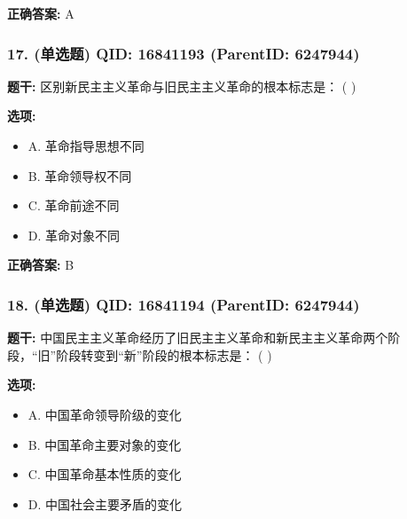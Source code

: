 \documentclass[12pt,UTF8]{ctexart}
\begin{document}
\textbf{正确答案:}
A

\vspace{0.3em}\hrulefill\vspace{0.7em}

\subsubsection*{17. (单选题) \small QID: 16841193 (ParentID: 6247944)}

\textbf{题干:}
区别新民主主义革命与旧民主主义革命的根本标志是： ( )



\textbf{选项:}
\begin{itemize}[leftmargin=*]

  \item A. 革命指导思想不同

  \item B. 革命领导权不同

  \item C. 革命前途不同

  \item D. 革命对象不同

\end{itemize}

\textbf{正确答案:}
B

\vspace{0.3em}\hrulefill\vspace{0.7em}

\subsubsection*{18. (单选题) \small QID: 16841194 (ParentID: 6247944)}

\textbf{题干:}
中国民主主义革命经历了旧民主主义革命和新民主主义革命两个阶段，“旧”阶段转变到“新”阶段的根本标志是： ( )



\textbf{选项:}
\begin{itemize}[leftmargin=*]

  \item A. 中国革命领导阶级的变化

  \item B. 中国革命主要对象的变化

  \item C. 中国革命基本性质的变化

  \item D. 中国社会主要矛盾的变化

\end{itemize}
\end{document}
